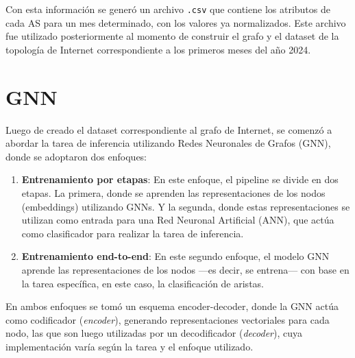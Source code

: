
Con esta información se generó un archivo \texttt{.csv} que contiene los atributos de cada AS para un mes determinado, con los valores ya normalizados. Este archivo fue utilizado posteriormente al momento de construir el grafo y el dataset de la topología de Internet correspondiente a los primeros meses del año 2024.\\

\section{GNN} \label{sec:gnn_section}

Luego de creado el dataset correspondiente al grafo de Internet, se comenzó a abordar la tarea de inferencia utilizando Redes Neuronales de Grafos (GNN), donde se adoptaron dos enfoques:

\begin{enumerate}

    \item \textbf{Entrenamiento por etapas}: En este enfoque, el pipeline se divide en dos etapas. La primera, donde se aprenden las representaciones de los nodos (embeddings) utilizando GNNs. Y la segunda, donde estas representaciones se utilizan como entrada para una Red Neuronal Artificial (ANN), que actúa como clasificador para realizar la tarea de inferencia.
    
    \item \textbf{Entrenamiento end-to-end}: En este segundo enfoque, el modelo GNN aprende las representaciones de los nodos —es decir, se entrena— con base en la tarea específica, en este caso, la clasificación de aristas.  
    
    

\end{enumerate}

En ambos enfoques se tomó un esquema encoder-decoder, donde la GNN actúa como codificador (\textit{encoder}), generando representaciones vectoriales para cada nodo, las que son luego utilizadas por un decodificador (\textit{decoder}), cuya implementación varía según la tarea y el enfoque utilizado. \\

